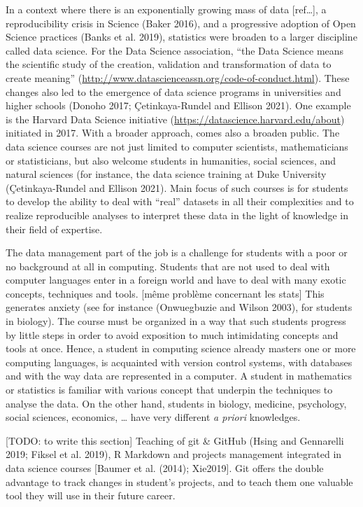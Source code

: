 \documentclass[
]{article}
\begin{document}
In a context where there is an exponentially growing mass of data
{[}ref\ldots{]}, a reproducibility crisis in Science (Baker 2016), and a
progressive adoption of Open Science practices (Banks et al. 2019),
statistics were broaden to a larger discipline called data science. For
the Data Science association, ``the Data Science means the scientific
study of the creation, validation and transformation of data to create
meaning'' (\url{http://www.datascienceassn.org/code-of-conduct.html}).
These changes also led to the emergence of data science programs in
universities and higher schools (Donoho 2017; Çetinkaya-Rundel and
Ellison 2021). One example is the Harvard Data Science initiative
(\url{https://datascience.harvard.edu/about}) initiated in 2017. With a
broader approach, comes also a broaden public. The data science courses
are not just limited to computer scientists, mathematicians or
statisticians, but also welcome students in humanities, social sciences,
and natural sciences (for instance, the data science training at Duke
University (Çetinkaya-Rundel and Ellison 2021). Main focus of such
courses is for students to develop the ability to deal with ``real''
datasets in all their complexities and to realize reproducible analyses
to interpret these data in the light of knowledge in their field of
expertise.

The data management part of the job is a challenge for students with a
poor or no background at all in computing. Students that are not used to
deal with computer languages enter in a foreign world and have to deal
with many exotic concepts, techniques and tools. {[}même problème
concernant les stats{]} This generates anxiety (see for instance
(Onwuegbuzie and Wilson 2003), for students in biology). The course must
be organized in a way that such students progress by little steps in
order to avoid exposition to much intimidating concepts and tools at
once. Hence, a student in computing science already masters one or more
computing languages, is acquainted with version control systems, with
databases and with the way data are represented in a computer. A student
in mathematics or statistics is familiar with various concept that
underpin the techniques to analyse the data. On the other hand, students
in biology, medicine, psychology, social sciences, economics, \ldots{}
have very different \emph{a priori} knowledges.

{[}TODO: to write this section{]} Teaching of git \& GitHub (Hsing and
Gennarelli 2019; Fiksel et al. 2019), R Markdown and projects management
integrated in data science courses {[}Baumer et al. (2014); Xie2019{]}.
Git offers the double advantage to track changes in student's projects,
and to teach them one valuable tool they will use in their future
career.
\end{document}
